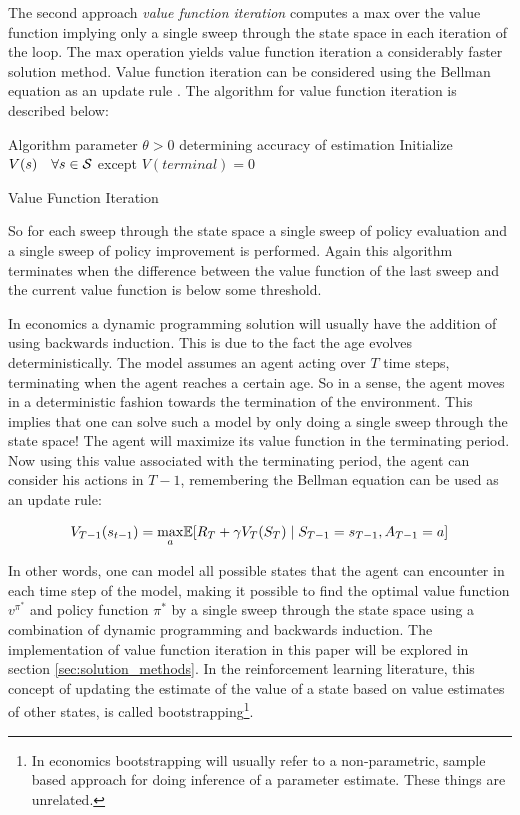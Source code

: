 The second approach \textit{value function iteration} computes a max over the value function implying only a single sweep through the state space in each iteration of the loop. The max operation yields value function iteration a considerably faster solution method. Value function iteration can be considered using the Bellman equation as an update rule \parencite{sutton_reinforcement_2018}. The algorithm for value function iteration is described below:

\begin{algorithm}[H]
\SetAlgoLined
{}
 Algorithm parameter $\theta > 0$ determining accuracy of estimation\;
 Initialize $V(s)\quad \forall s \in \mathcal{S}$ except $V(terminal) = 0$\;
 \caption{Value Function Iteration}
\end{algorithm}

 So for each sweep through the state space a single sweep of policy evaluation and a single sweep of policy improvement is performed. Again this algorithm terminates when the difference between the value function of the last sweep and the current value function is below some threshold.
 
 In economics a dynamic programming solution will usually have the addition of using backwards induction. This is due to the fact the age evolves deterministically. The model assumes an agent acting over $T$ time steps, terminating when the agent reaches a certain age. So in a sense, the agent moves in a deterministic fashion towards the termination of the environment. This implies that one can solve such a model by only doing a single sweep through the state space! The agent will maximize its value function in the terminating period. Now using this value associated with the terminating period, the agent can consider his actions in $T-1$, remembering the Bellman equation can be used as an update rule:
 
 \begin{equation}
     V_{T-1}(s_{t-1}) = \underset{a}{\max}\mathbb{E} [R_T + \gamma V_T (S_T) \mid S_{T-1} = s_{T-1}, A_{T-1} = a]
 \end{equation}
 
 In other words, one can model all possible states that the agent can encounter in each time step of the model, making it possible to find the optimal value function $v^{\pi^*}$ and policy function $\pi^{*}$ by a single sweep through the state space using a combination of dynamic programming and backwards induction. The implementation of value function iteration in this paper will be explored in section \ref{sec:solution_methods}. In the reinforcement learning literature, this concept of updating the estimate of the value of a state based on value estimates of other states, is called bootstrapping\footnote{In economics bootstrapping will usually refer to a non-parametric, sample based approach for doing inference of a parameter estimate. These things are unrelated.}. 

